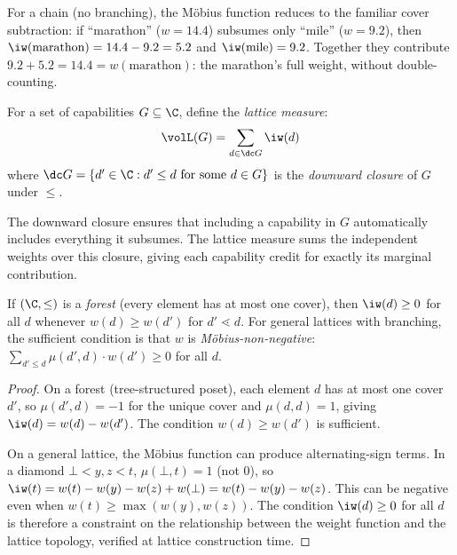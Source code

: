 For a chain (no branching), the M\"{o}bius function reduces to the familiar
cover subtraction: if ``marathon'' ($w = 14.4$) subsumes only ``mile'' ($w =
9.2$), then $\iw(\text{marathon}) = 14.4 - 9.2 = 5.2$ and $\iw(\text{mile})
= 9.2$. Together they contribute $9.2 + 5.2 = 14.4 = w(\text{marathon})$: the
marathon's full weight, without double-counting.

\begin{definition}
\label{def:lattice_measure}
For a set of capabilities $G \subseteq \C$, define the \emph{lattice measure}:
\begin{equation}
\label{eq:lattice_measure}
\volL(G) = \sum_{d \in \dc G} \iw(d)
\end{equation}
where $\dc G = \{d' \in \C : d' \leq d \text{ for some } d \in G\}$ is the
    \emph{downward closure} of $G$ under $\leq$.
\end{definition}

The downward closure ensures that including a capability in $G$ automatically
includes everything it subsumes. The lattice measure sums the independent
weights over this closure, giving each capability credit for exactly its
marginal contribution.

\begin{lemma}
\label{lem:nonneg_iw}
If $(\C, \leq)$ is a \emph{forest} (every element has at most one cover),
    then $\iw(d) \geq 0$ for all $d$ whenever $w(d) \geq w(d')$ for $d'
    \lessdot d$. For general lattices with branching, the sufficient condition
    is that $w$ is \emph{M\"{o}bius-non-negative}: $\sum_{d' \leq d}
    \mu(d', d) \cdot w(d') \geq 0$ for all $d$.
\end{lemma}

\begin{proof}
On a forest (tree-structured poset), each element $d$ has at most one cover
$d'$, so $\mu(d', d) = -1$ for the unique cover and $\mu(d, d) = 1$, giving
$\iw(d) = w(d) - w(d')$. The condition $w(d) \geq w(d')$ is sufficient.

On a general lattice, the M\"{o}bius function can produce alternating-sign
terms. In a diamond $\bot < y, z < t$, $\mu(\bot, t) = 1$ (not $0$), so
$\iw(t) = w(t) - w(y) - w(z) + w(\bot) = w(t) - w(y) - w(z)$. This can be
negative even when $w(t) \geq \max(w(y), w(z))$. The condition $\iw(d) \geq
0$ for all $d$ is therefore a constraint on the relationship between the weight
function and the lattice topology, verified at lattice construction time.
\end{proof}

